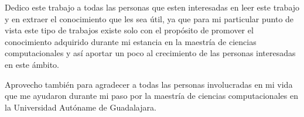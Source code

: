 
Dedico este trabajo a todas las personas que esten interesadas en leer este trabajo y en extraer el conocimiento que les sea útil, ya que para mi particular punto de vista este tipo de trabajos existe solo con el propósito de promover el conocimiento adquirido durante mi estancia en la maestría de ciencias computacionales y así aportar un poco al crecimiento de las personas interesadas en este ámbito.

Aprovecho también para agradecer a todas las personas involucradas en mi vida que me ayudaron durante mi paso por la maestría de ciencias computacionales en la Universidad Autóname de Guadalajara.